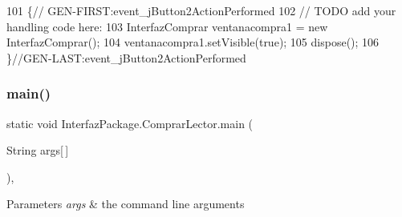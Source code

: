 \begin{DoxyCode}
101                                                                          \{\textcolor{comment}{//
      GEN-FIRST:event\_jButton2ActionPerformed}
102         \textcolor{comment}{// TODO add your handling code here:}
103         InterfazComprar ventanacompra1 = \textcolor{keyword}{new} InterfazComprar();
104         ventanacompra1.setVisible(\textcolor{keyword}{true});
105         dispose();
106     \}\textcolor{comment}{//GEN-LAST:event\_jButton2ActionPerformed}
\end{DoxyCode}
\mbox{\label{class_interfaz_package_1_1_comprar_lector_a3884254a34d91bf1423ec3f2ee38b929}} 
\subsubsection{\texorpdfstring{main()}{main()}}
{\footnotesize\ttfamily static void Interfaz\+Package.\+Comprar\+Lector.\+main (\begin{DoxyParamCaption}\item[{String}]{args\mbox{[}$\,$\mbox{]} }\end{DoxyParamCaption})\hspace{0.3cm}{\ttfamily [inline]}, {\ttfamily [static]}}


\begin{DoxyParams}{Parameters}
{\em args} & the command line arguments \\
\hline
\end{DoxyParams}

